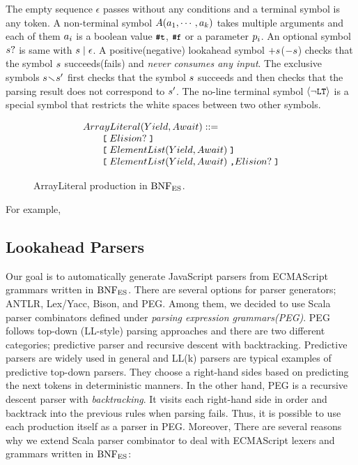 The empty sequence \( \epsilon \) passes without any conditions
and a terminal symbol is any token.
A non-terminal symbol \( A(a_1, \cdots, a_k) \)
takes multiple arguments and each of them \( a_i \) is
a boolean value \( \texttt{\small\#t} \), \( \texttt{\small\#f} \) or a parameter \( p_i \).
An optional symbol \( s? \) is same with \( s \mid \epsilon \).
A positive(negative) lookahead symbol \( +s \)(\( -s \))
checks that the symbol \( s \) succeeds(fails) and
\textit{never consumes any input}.
The exclusive symbols \( s \!\smallsetminus\! s' \)
first checks that the symbol \( s \) succeeds
and then checks that the parsing result does not correspond to \( s' \).
The no-line terminal symbol \( \left<\neg\texttt{\small LT}\right> \) is a special symbol
that restricts the white spaces between two other symbols.

\begin{figure}
  \centering
  \[
    \begin{array}{l}
      ArrayLiteral(Yield, Await) ::=\\
      \qquad \texttt{\small[} \; Elision? \; \texttt{\small]}\\
      \qquad \texttt{\small[} \; ElementList(Yield, Await) \; \texttt{\small]}\\
      \qquad \texttt{\small[} \; ElementList(Yield, Await) \; \texttt{\small,} Elision? \; \texttt{\small]}\\
    \end{array}
  \]
  \caption{ArrayLiteral production in \( \text{BNF}_{\text{ES}} \).}
  \label{fig:array-literal-bnfes}
\end{figure}

For example, 

\subsection{Lookahead Parsers}

Our goal is to automatically generate JavaScript parsers from ECMAScript
grammars written in \( \text{BNF}_{\text{ES}} \). There are several options for parser generators;
ANTLR, Lex/Yacc, Bison, and PEG. Among them, we decided to use
Scala parser combinators defined under \textit{parsing expression grammars(PEG)}.
PEG follows top-down (LL-style) parsing approaches and there are two different
categories; predictive parser and recursive descent with backtracking.
Predictive parsers are widely used in general and LL(k) parsers are typical
examples of predictive top-down parsers.
They choose a right-hand sides based on predicting the next tokens in deterministic
manners. In the other hand, PEG is a recursive descent parser with
\textit{backtracking}. It visits each right-hand side in order and backtrack
into the previous rules when parsing fails.
Thus, it is possible to use each production itself as a parser
in PEG. Moreover, There are several reasons why we extend Scala parser combinator
to deal with ECMAScript lexers and grammars written in \( \text{BNF}_{\text{ES}} \):

